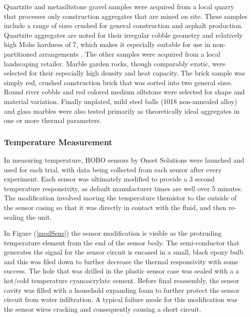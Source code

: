 Quartzite and metasiltstone gravel samples were acquired from a local quarry that processes only construction aggregates that are mined on site. These samples include a range of sizes crushed for general construction and asphalt production. Quartzite aggregates are noted for their irregular cobble geometry and relatively high Mohs hardness of 7, which makes it especially suitable for use in non-partitioned arrangements \citep{ballast}. The other samples were acquired from a local landscaping retailer. Marble garden rocks, though comparably exotic, were selected for their especially high density and heat capacity. The brick sample was simply red, crushed construction brick that was sorted into two general sizes. Round river cobble and red colored medium siltstone were selected for shape and material variation. Finally unplated, mild steel balls (1018 non-annealed alloy) and glass marbles were also tested primarily as theoretically ideal aggregates in one or more thermal parameters.

\subsubsection{Temperature Measurement}
In measuring temperature, HOBO sensors by Onset Solutions were launched and used for each trial, with data being collected from each sensor after every experiment. Each sensor was ultimately modified to provide a 3 second temperature responsivity, as default manufacturer times are well over 5 minutes. The modification involved moving the temperature themistor to the outside of the sensor casing so that it was directly in contact with the fluid, and then re-sealing the unit. 

In Figure (\ref{modSens}) the sensor modification is visible as the protruding temperature element from the end of the sensor body. The semi-conductor that generates the signal for the sensor circuit is encased in a small, black epoxy bulb and this was filed down to further decrease the thermal responsivity with some success. The hole that was drilled in the plastic sensor case was sealed with a a hot/cold temperature cyanoacrylate cement. Before final reassembly, the sensor cavity was filled with a household expanding foam to further protect the sensor circuit from water infiltration. A typical failure mode for this modification was the sensor wires cracking and consequently causing a short circuit. 

